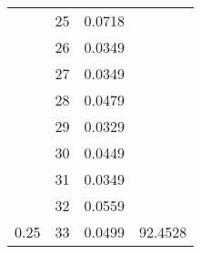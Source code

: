 \documentclass{article}
\begin{document}
\begin{multicols}{2}
\begin{table}[H]
\begin{tabular}{|c|c|c|c|}
 & 25 & 0.0718 &  \\ \cline{2-3}
 & 26 & 0.0349 &  \\ \cline{2-3}
 & 27 & 0.0349 &  \\ \cline{2-3}
 & 28 & 0.0479 &  \\ \cline{2-3}
 & 29 & 0.0329 &  \\ \cline{2-3}
 & 30 & 0.0449 &  \\ \cline{2-3}
 & 31 & 0.0349 &  \\ \cline{2-3}
 & 32 & 0.0559 &  \\ \cline{2-3}
\multirow{-34}{*}{0.25} & 33 & 0.0499 & \multirow{-21}{*}{92.4528} \\ \hline
\end{tabular}
\end{table}



\end{multicols}
\end{document}
